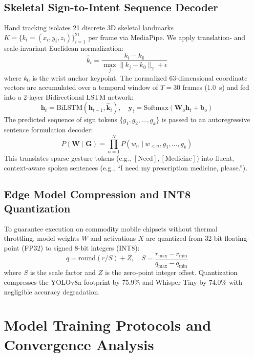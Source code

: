 \documentclass[conference]{IEEEtran}
\begin{document}
\subsection{Skeletal Sign-to-Intent Sequence Decoder}
Hand tracking isolates 21 discrete 3D skeletal landmarks $K = \{k_i = (x_i, y_i, z_i)\}_{i=1}^{21}$ per frame via MediaPipe. We apply translation- and scale-invariant Euclidean normalization:
\begin{equation}
\hat{k}_i = \frac{k_i - k_0}{\max_{j} \|k_j - k_0\|_2 + \epsilon}
\label{eq:keypoint_norm}
\end{equation}
where $k_0$ is the wrist anchor keypoint. The normalized 63-dimensional coordinate vectors are accumulated over a temporal window of $T=30$ frames ($1.0$~s) and fed into a 2-layer Bidirectional LSTM network:
\begin{equation}
\mathbf{h}_t = \text{BiLSTM}(\mathbf{h}_{t-1}, \hat{\mathbf{k}}_t), \quad \mathbf{y}_t = \text{Softmax}(\mathbf{W}_o \mathbf{h}_t + \mathbf{b}_o)
\end{equation}
The predicted sequence of sign tokens $\{g_1, g_2, \dots, g_k\}$ is passed to an autoregressive sentence formulation decoder:
\begin{equation}
P(\mathbf{W} \mid \mathbf{G}) = \prod_{n=1}^{N} P(w_n \mid w_{<n}, g_1, \dots, g_k)
\end{equation}
This translates sparse gesture tokens (e.g., $[\text{Need}], [\text{Medicine}]$) into fluent, context-aware spoken sentences (e.g., ``I need my prescription medicine, please.'').

\subsection{Edge Model Compression and INT8 Quantization}
To guarantee execution on commodity mobile chipsets without thermal throttling, model weights $W$ and activations $X$ are quantized from 32-bit floating-point (FP32) to signed 8-bit integers (INT8):
\begin{equation}
q = \text{round}(r / S) + Z, \quad S = \frac{r_{\max} - r_{\min}}{q_{\max} - q_{\min}}
\label{eq:quantization}
\end{equation}
where $S$ is the scale factor and $Z$ is the zero-point integer offset. Quantization compresses the YOLOv8n footprint by 75.9\% and Whisper-Tiny by 74.0\% with negligible accuracy degradation.

\section{Model Training Protocols and Convergence Analysis}
\end{document}
